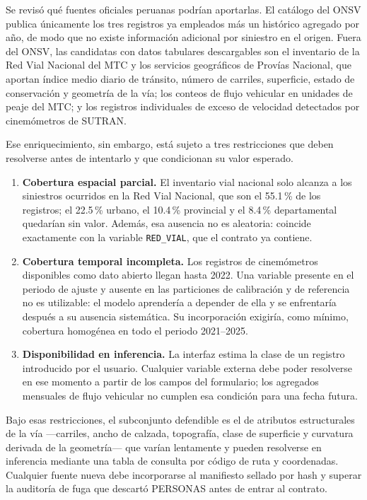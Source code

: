 Se revisó qué fuentes oficiales peruanas podrían aportarlas. El catálogo del ONSV publica únicamente los tres registros ya empleados más un histórico agregado por año, de modo que no existe información adicional por siniestro en el origen. Fuera del ONSV, las candidatas con datos tabulares descargables son el inventario de la Red Vial Nacional del MTC y los servicios geográficos de Provías Nacional, que aportan índice medio diario de tránsito, número de carriles, superficie, estado de conservación y geometría de la vía; los conteos de flujo vehicular en unidades de peaje del MTC; y los registros individuales de exceso de velocidad detectados por cinemómetros de SUTRAN.

Ese enriquecimiento, sin embargo, está sujeto a tres restricciones que deben resolverse antes de intentarlo y que condicionan su valor esperado.

\begin{enumerate}
  \item \textbf{Cobertura espacial parcial.} El inventario vial nacional solo alcanza a los siniestros ocurridos en la Red Vial Nacional, que son el 55.1\,\% de los registros; el 22.5\,\% urbano, el 10.4\,\% provincial y el 8.4\,\% departamental quedarían sin valor. Además, esa ausencia no es aleatoria: coincide exactamente con la variable \texttt{RED\_VIAL}, que el contrato ya contiene.
  \item \textbf{Cobertura temporal incompleta.} Los registros de cinemómetros disponibles como dato abierto llegan hasta 2022. Una variable presente en el periodo de ajuste y ausente en las particiones de calibración y de referencia no es utilizable: el modelo aprendería a depender de ella y se enfrentaría después a su ausencia sistemática. Su incorporación exigiría, como mínimo, cobertura homogénea en todo el periodo 2021--2025.
  \item \textbf{Disponibilidad en inferencia.} La interfaz estima la clase de un registro introducido por el usuario. Cualquier variable externa debe poder resolverse en ese momento a partir de los campos del formulario; los agregados mensuales de flujo vehicular no cumplen esa condición para una fecha futura.
\end{enumerate}

Bajo esas restricciones, el subconjunto defendible es el de atributos estructurales de la vía ---carriles, ancho de calzada, topografía, clase de superficie y curvatura derivada de la geometría--- que varían lentamente y pueden resolverse en inferencia mediante una tabla de consulta por código de ruta y coordenadas. Cualquier fuente nueva debe incorporarse al manifiesto sellado por hash y superar la auditoría de fuga que descartó PERSONAS antes de entrar al contrato.

